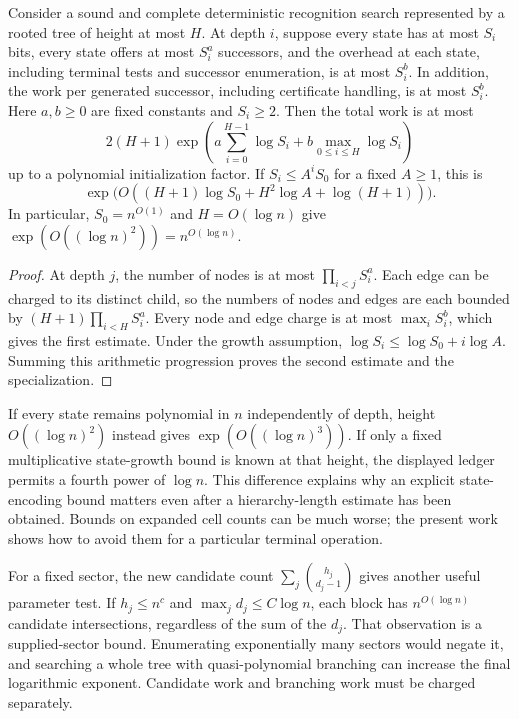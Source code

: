 \begin{proposition}
\label{main:ledger}
Consider a sound and complete deterministic recognition search represented
by a rooted tree of height at most $H$.  At depth $i$, suppose every state
has at most $S_i$ bits, every state offers at most $S_i^a$ successors, and
the overhead at each state, including terminal tests and successor enumeration,
is at most $S_i^b$.  In addition, the work per generated successor, including
certificate handling, is at most $S_i^b$.  Here $a,b\geq0$ are fixed constants
and $S_i\geq2$.  Then the total
work is at most
\[
 2(H+1)\exp\!\left(
       a\sum_{i=0}^{H-1}\log S_i+b\max_{0\leq i\leq H}\log S_i
                       \right)
\]
up to a polynomial initialization factor.  If $S_i\leq A^iS_0$ for a
fixed $A\geq1$, this is
\[
 \exp\!\bigl(O((H+1)\log S_0+H^2\log A+\log(H+1))\bigr).
\]
In particular, $S_0=n^{O(1)}$ and $H=O(\log n)$ give
$\exp(O((\log n)^2))=n^{O(\log n)}$.
\end{proposition}
\begin{proof}
At depth $j$, the number of nodes is at most
$\prod_{i<j}S_i^a$.  Each edge can be charged to its distinct child, so
the numbers of nodes and edges are each bounded by
$(H+1)\prod_{i<H}S_i^a$.  Every node and edge charge is at most
$\max_i S_i^b$, which gives the first estimate.  Under the growth
assumption, $\log S_i\leq\log S_0+i\log A$.  Summing this arithmetic
progression proves the second estimate and the specialization.
\end{proof}

If every state remains polynomial in $n$ independently of depth, height
$O((\log n)^2)$ instead gives $\exp(O((\log n)^3))$.  If only a fixed
multiplicative state-growth bound is known at that height, the displayed
ledger permits a fourth power of $\log n$.  This difference explains why an
explicit state-encoding bound matters even after a hierarchy-length estimate
has been obtained.  Bounds on expanded cell counts can be much worse; the
present work shows how to avoid them for a particular terminal operation.

For a fixed sector, the new candidate count
$\sum_j\binom{h_j}{d_j-1}$ gives another useful parameter test.  If
$h_j\leq n^c$ and $\max_jd_j\leq C\log n$, each block has
$n^{O(\log n)}$ candidate intersections, regardless of the sum of the
$d_j$.  That observation is a supplied-sector bound.  Enumerating exponentially
many sectors would negate it, and searching a whole tree with quasi-polynomial
branching can increase the final logarithmic exponent.  Candidate work and
branching work must be charged separately.

